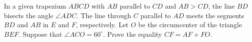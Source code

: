 \problem
In a given trapezium $ABCD$ with $AB$ parallel to $CD$ and $AB > CD$,
the line $BD$ bisects the angle $\angle ADC$.
The line through $C$ parallel to $AD$ meets the segments $BD$ and $AB$ in $E$
and $F$, respectively.
Let $O$ be the circumcenter of the triangle $BEF$.
Suppose that $\angle ACO = 60^{\circ}$.
Prove the equality $CF = AF + FO$.
\solution
\endproblem

